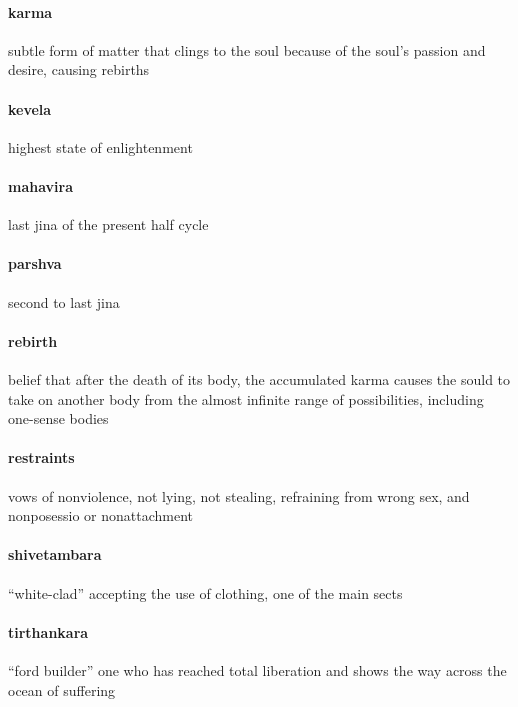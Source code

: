 \documentclass{article}
\begin{document}
\paragraph{karma}
\label{par:karma}
subtle form of matter that clings to the soul because of the soul's passion and desire, causing rebirths
\paragraph{kevela}
\label{par:kevela}
highest state of enlightenment
\paragraph{mahavira}
\label{par:mahavira}
last jina of the present half cycle
\paragraph{parshva}
\label{par:parshva}
second to last jina
\paragraph{rebirth}
\label{par:rebirth}
belief that after the death of its body, the accumulated karma causes the sould to take on another body from the almost infinite range of possibilities, including one-sense bodies
\paragraph{restraints}
\label{par:restraints}
vows of nonviolence, not lying, not stealing, refraining from wrong sex, and nonposessio or nonattachment
\paragraph{shivetambara}
\label{par:shivetambara}
``white-clad'' accepting the use of clothing, one of the main sects
\paragraph{tirthankara}
\label{par:tirthankara}
``ford builder'' one who has reached total liberation and shows the way across the ocean of suffering
\end{document}
